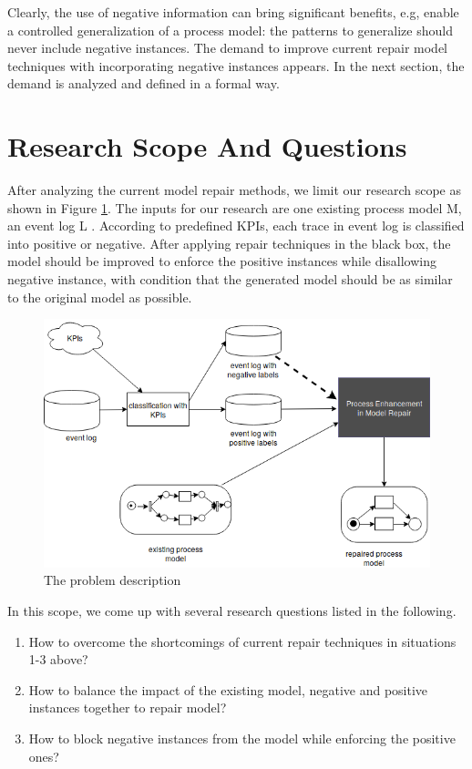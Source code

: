 Clearly, the use of negative information can bring significant benefits, e.g, enable a controlled generalization of a process model: the patterns to generalize should never include negative instances. The demand to improve current repair model techniques with incorporating negative instances appears. In the next section, the demand is analyzed and defined in a formal way.

\section{Research Scope And Questions }
After analyzing the current model repair methods, we limit our research scope as shown in Figure \ref{fig:scope}.  The inputs for our research are one existing process model M, an event log L . According to predefined KPIs, each trace in event log is classified into positive or negative. After applying repair techniques in the black box, the model should be improved to enforce the positive instances while disallowing negative instance, with condition that the generated model should be as similar to the original model as possible. 
\begin{figure}
	\centering
	\includegraphics[width=\textwidth]{figures/introduction/FD_approach_blackbox.png}
	\caption{The problem description}
	\label{fig:scope}
\end{figure}

In this scope, we come up with several research questions listed in the following.
\begin{enumerate}[start=1,label={\bfseries{ RQ\arabic*:}}]
	\item How to overcome the shortcomings of current repair techniques in situations 1-3 above?
	\item How to balance the impact of the existing model, negative and positive instances together to repair model? 
	\item How to block negative instances from the model while enforcing the positive ones?
\end{enumerate}
  
